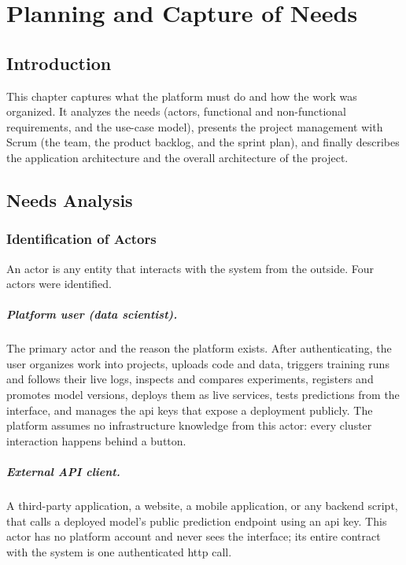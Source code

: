 \chapter{Planning and Capture of Needs}
\label{chap:requirements}

\section*{Introduction}
This chapter captures what the platform must do and how the work was organized. It
analyzes the needs (actors, functional and non-functional requirements, and the
use-case model), presents the project management with Scrum (the team, the product
backlog, and the sprint plan), and finally describes the application architecture
and the overall architecture of the project.

\section{Needs Analysis}
\label{sec:requirements}

\subsection{Identification of Actors}
An actor is any entity that interacts with the system from the outside. Four
actors were identified.

\paragraph{Platform user (data scientist).}
The primary actor and the reason the platform exists. After authenticating, the
user organizes work into projects, uploads code and data, triggers training runs
and follows their live logs, inspects and compares experiments, registers and
promotes model versions, deploys them as live services, tests predictions from
the interface, and manages the \gls{api} keys that expose a deployment publicly.
The platform assumes no infrastructure knowledge from this actor: every cluster
interaction happens behind a button.

\paragraph{External API client.}
A third-party application, a website, a mobile application, or any backend
script, that calls a deployed model's public prediction endpoint using an
\gls{api} key. This actor has no platform account and never sees the interface;
its entire contract with the system is one authenticated \gls{http} call.


